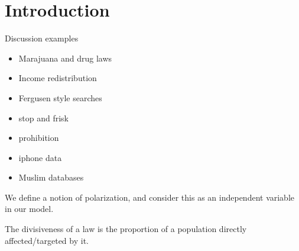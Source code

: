 %

\section{Introduction}
\label{sec:intro}

Discussion examples
\begin{itemize}
\item Marajuana and drug laws
\item Income redistribution
\item Fergusen style searches
\item stop and frisk
\item prohibition
\item iphone data
\item Muslim databases
\end{itemize}

We define a notion of polarization, and consider this as an independent variable in our model.

The divisiveness of a law is the proportion of a population directly affected/targeted by it.

